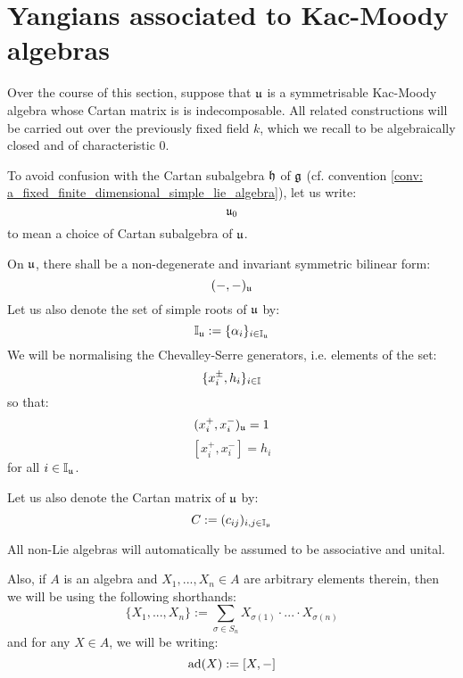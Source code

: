 \section{Yangians associated to Kac-Moody algebras}
    \begin{convention}
        Over the course of this section, suppose that $\mathfrak{u}$ is a symmetrisable Kac-Moody algebra whose Cartan matrix is is indecomposable. All related constructions will be carried out over the previously fixed field $k$, which we recall to be algebraically closed and of characteristic $0$. 

        To avoid confusion with the Cartan subalgebra $\mathfrak{h}$ of $\mathfrak{g}$ (cf. convention \ref{conv: a_fixed_finite_dimensional_simple_lie_algebra}), let us write:
            $$\mathfrak{u}_0$$
        to mean a choice of Cartan subalgebra of $\mathfrak{u}$. 
        
        On $\mathfrak{u}$, there shall be a non-degenerate and invariant symmetric bilinear form:
            $$(-, -)_{\mathfrak{u}}$$
        Let us also denote the set of simple roots of $\mathfrak{u}$ by:
            $$\mathbb{I}_{\mathfrak{u}} := \{\alpha_i\}_{i \in \mathbb{I}_{\mathfrak{u}}}$$
        We will be normalising the Chevalley-Serre generators, i.e. elements of the set:
            $$\{x_i^{\pm}, h_i\}_{i \in \mathbb{I}}$$
        so that:
            $$(x_i^+, x_i^-)_{\mathfrak{u}} = 1$$
            $$[x_i^+, x_i^-] = h_i$$
        for all $i \in \mathbb{I}_{\mathfrak{u}}$.

        Let us also denote the Cartan matrix of $\mathfrak{u}$ by:
            $$C := (c_{ij})_{i, j \in \mathbb{I}_{\mathfrak{u}}}$$
    \end{convention}

    \begin{convention}
        All non-Lie algebras will automatically be assumed to be associative and unital. 

        Also, if $A$ is an algebra and $X_1, ..., X_n \in A$ are arbitrary elements therein, then we will be using the following shorthands:
            $$\{ X_1, ..., X_n \} := \sum_{\sigma \in S_n} X_{\sigma(1)} \cdot ... \cdot X_{\sigma(n)}$$
        and for any $X \in A$, we will be writing:
            $$\mathrm{ad}(X) := [X, -]$$
    \end{convention}


